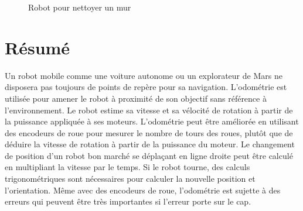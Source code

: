 {\begin{figure}
\begin{center}
\end{center}
\caption{Robot pour nettoyer un mur}\label{fig.wallcleaning}
\end{figure}

\section{Résumé}

Un robot mobile comme une voiture autonome ou un explorateur de Mars ne disposera pas toujours de points de repère pour sa navigation. L'odométrie est utilisée pour amener le robot à proximité de son objectif sans référence à l'environnement. Le robot estime sa vitesse et sa vélocité de rotation à partir de la puissance appliquée à ses moteurs. L'odométrie peut être améliorée en utilisant des encodeurs de roue pour mesurer le nombre de tours des roues, plutôt que de déduire la vitesse de rotation à partir de la puissance du moteur. Le changement de position d'un robot bon marché se déplaçant en ligne droite peut être calculé en multipliant la vitesse par le temps. Si le robot tourne, des calculs trigonométriques sont nécessaires pour calculer la nouvelle position et l'orientation. Même avec des encodeurs de roue, l'odométrie est sujette à des erreurs qui peuvent être très importantes si l'erreur porte sur le cap.

}
